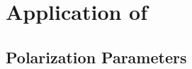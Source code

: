 \section[Application of \textsc{stops}]{Application of \stops} \label{sec:results_unpub}







\subsection{Polarization Parameters} \label{subsec:test_polarization}

